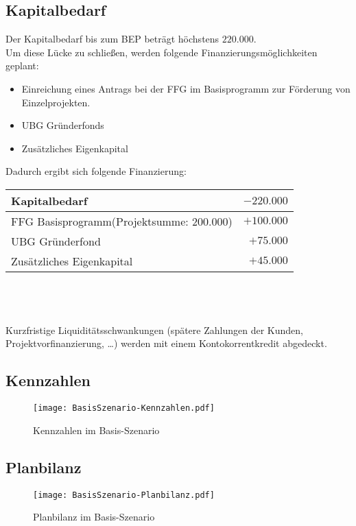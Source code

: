 \subsection{Kapitalbedarf}
Der Kapitalbedarf bis zum BEP beträgt höchstens $220.000$\officialeuro.\\
Um diese Lücke zu schließen, werden folgende Finanzierungsmöglichkeiten geplant:
\begin{itemize}
	\item Einreichung eines Antrags bei der FFG im Basisprogramm zur Förderung von Einzelprojekten.
	\item UBG Gründerfonds
	\item Zusätzliches Eigenkapital
\end{itemize}
Dadurch ergibt sich folgende Finanzierung:\\
\begin{tabular}{l r}
	Kapitalbedarf & $-220.000$\officialeuro \\
	\hline
	FFG Basisprogramm(Projektsumme: $200.000$\officialeuro) & $+100.000$\officialeuro \\
	UBG Gründerfond & $+75.000$\officialeuro \\
	Zusätzliches Eigenkapital & $+45.000$\officialeuro \\
	\bottomrule
\end{tabular}\\
\\
\\Kurzfristige Liquiditätsschwankungen (spätere Zahlungen der Kunden, Projektvorfinanzierung, …) werden mit einem Kontokorrentkredit abgedeckt.

\subsection{Kennzahlen}
\begin{figure}[h]
	\centering
	\texttt{[image: BasisSzenario-Kennzahlen.pdf]}
	\caption{Kennzahlen im Basis-Szenario}
	\label{fig:BasisSzenario-Kennzahlen}
\end{figure}
\newpage
\subsection{Planbilanz}
\begin{figure}[h]
	\centering
	\texttt{[image: BasisSzenario-Planbilanz.pdf]}
	\caption{Planbilanz im Basis-Szenario}
	\label{fig:BasisSzenario-Planbilanz}
\end{figure}

